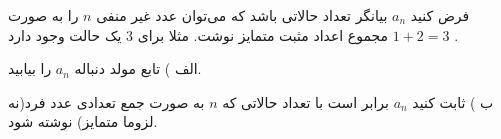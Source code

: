 \EXERCISE
فرض کنید 
$a_n$
بیانگر تعداد حالاتی باشد که می‌توان عدد غیر منفی 
$n$
را به صورت مجموع اعداد مثبت متمایز نوشت. مثلا برای 
$3$
 یک حالت وجود دارد 
$1 + 2 = 3$ 
.

الف ) تابع مولد دنباله 
$a_n$
 را بیابید.
 
ب ) ثابت کنید 
$a_n$
 برابر است با تعداد حالاتی که 
$n$
  به صورت جمع تعدادی عدد فرد(نه لزوما متمایز) نوشته شود.